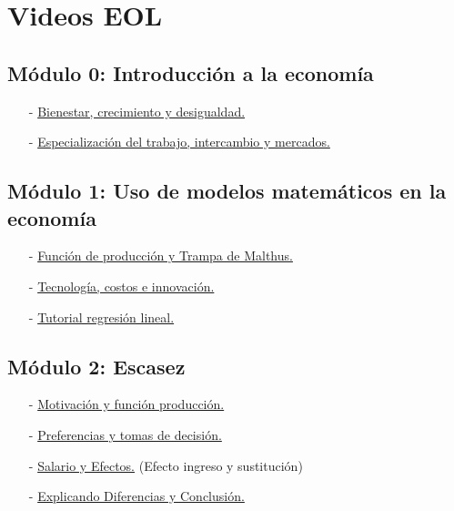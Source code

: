 \section{Videos EOL}

\subsection*{Módulo 0: Introducción a la economía}

\begin{itemize}
    \item[-] \href{https://www.youtube.com/watch?v=Bk_XdL-Yq2E}{Bienestar, crecimiento y desigualdad.}
    
    \item[-] \href{https://www.youtube.com/watch?v=QhNrHly3Kd8}{Especialización del trabajo, intercambio y mercados.}

\end{itemize}

\subsection*{Módulo 1: Uso de modelos matemáticos en la economía}

\begin{itemize}
    \item[-] \href{https://www.youtube.com/watch?v=PhbLaTLzIAk}{Función de producción y Trampa de Malthus.}
    
    \item[-] \href{https://www.youtube.com/watch?v=DXGO7kK1uXI}{Tecnología, costos e innovación.}
    
    \item[-] \href{https://www.youtube.com/watch?v=-bYKV0pErEA}{Tutorial regresión lineal.}
    
\end{itemize}

\subsection*{Módulo 2: Escasez}

\begin{itemize}
    \item[-] \href{https://www.youtube.com/watch?v=P29Zd1-FGxE}{Motivación y función producción.}
    
    \item[-] \href{https://www.youtube.com/watch?v=R7monXl_M4E}{Preferencias y tomas de decisión.}
    
    \item[-] \href{https://www.youtube.com/watch?v=J-MyCczFGZc}{Salario y Efectos.} (Efecto ingreso y sustitución)
    
    \item[-] \href{https://www.youtube.com/watch?v=6gd_bGovblk}{Explicando Diferencias y Conclusión.}
    
\end{itemize}

